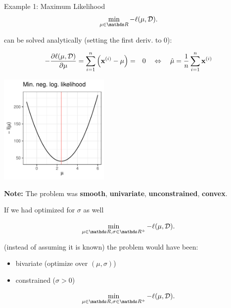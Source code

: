 \begin{vbframe}{Example 1: Maximum Likelihood}
$$
	\min_{\mu \in \R} - \ell(\mu, \D).
$$

can be solved analytically (setting the first deriv. to $0$):
\vspace*{-0.5cm}

\begin{footnotesize}
\begin{eqnarray*}
	-\frac{\partial \ell(\mu, \mathcal{D})}{\partial \mu} = \sum\limits_{i=1}^n \left(\mathbf{x}^{(i)} - \mu\right) &=& 0 \quad \Leftrightarrow \quad \hat \mu = \frac{1}{n} \sum\limits_{i=1}^n \mathbf{x}^{(i)} 
\end{eqnarray*}
\end{footnotesize}

\vspace*{-0.4cm}

\begin{center}
	\begin{footnotesize}
	\includegraphics[width=0.4\textwidth, keepaspectratio]{figure_man/ml_normal_example_negloglike.pdf} 
	\end{footnotesize}
\end{center}

\framebreak 

\textbf{Note: } The problem was \textbf{smooth}, \textbf{univariate}, \textbf{unconstrained}, \textbf{convex}. 

\lz 

If we had optimized for $\sigma$ as well 

$$
	\min_{\mu \in \R, \sigma \in \R^+} - \ell(\mu, \D).
$$


(instead of assuming it is known) the problem would have been: 

\begin{itemize}
	\item bivariate (optimize over $(\mu, \sigma)$)
	\item constrained ($\sigma > 0$)
\end{itemize}

$$
	\min_{\mu \in \R, \sigma \in \R^+} - \ell(\mu, \D).
$$

\end{vbframe}


